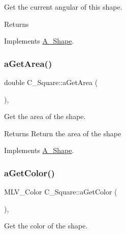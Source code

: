 Get the current angular of this shape. 

\begin{DoxyReturn}{Returns}

\end{DoxyReturn}


Implements \hyperlink{classA__Shape_a80fa4e009c875dd0ba7fc5bfeeb43f98}{A\+\_\+\+Shape}.

\mbox{\label{classC__Square_affd2be59872618d5d1955be360fb73e6}} 
\subsubsection{\texorpdfstring{a\+Get\+Area()}{aGetArea()}}
{\footnotesize\ttfamily double C\+\_\+\+Square\+::a\+Get\+Area (\begin{DoxyParamCaption}{ }\end{DoxyParamCaption})\hspace{0.3cm}{\ttfamily [override]}, {\ttfamily [virtual]}}



Get the area of the shape. 

\begin{DoxyReturn}{Returns}
Return the area of the shape 
\end{DoxyReturn}


Implements \hyperlink{classA__Shape_a1b142ee2d873d6c217f65de1632e7b6e}{A\+\_\+\+Shape}.

\mbox{\label{classC__Square_a44b1e58b20cc98edc774a73742fec9a7}} 
\subsubsection{\texorpdfstring{a\+Get\+Color()}{aGetColor()}}
{\footnotesize\ttfamily M\+L\+V\+\_\+\+Color C\+\_\+\+Square\+::a\+Get\+Color (\begin{DoxyParamCaption}{ }\end{DoxyParamCaption})\hspace{0.3cm}{\ttfamily [override]}, {\ttfamily [virtual]}}



Get the color of the shape. 

